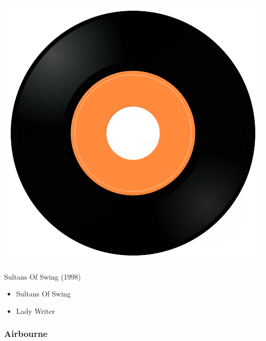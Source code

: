 \begin{minipage}[t]{0.25\textwidth}
\captionsetup{type=figure}
\includegraphics[width=\textwidth]{Images/cover.png}
\caption*{Sultans Of Swing (1998)}
\end{minipage}
\begin{minipage}[t]{0.25\textwidth}\vspace{0pt}
\begin{itemize}[nosep,leftmargin=1em,labelwidth=*,align=left]
	\setlength{\itemsep}{0pt}
	\item Sultans Of Swing
	\item Lady Writer
\end{itemize}
\end{minipage}

\subsubsection{Airbourne}

